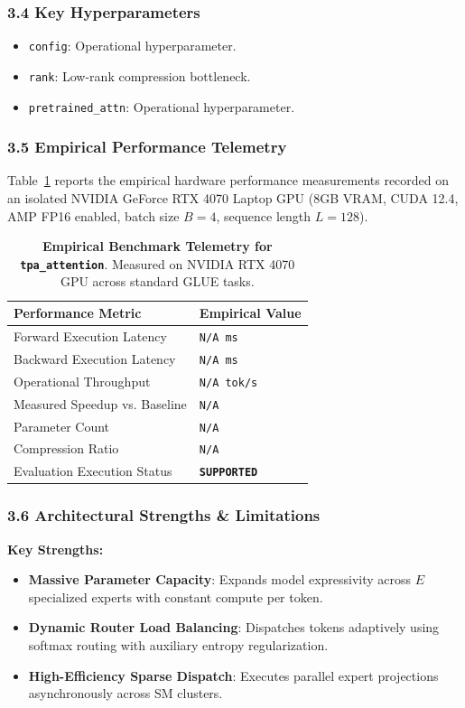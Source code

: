 \subsubsection*{3.4 Key Hyperparameters}
\begin{itemize}
    \item \texttt{config}: Operational hyperparameter.
    \item \texttt{rank}: Low-rank compression bottleneck.
    \item \texttt{pretrained\_attn}: Operational hyperparameter.
\end{itemize}

\subsubsection*{3.5 Empirical Performance Telemetry}
Table~\ref{tab:telemetry_tpa_attention} reports the empirical hardware performance measurements recorded on an isolated NVIDIA GeForce RTX 4070 Laptop GPU (8GB VRAM, CUDA 12.4, AMP FP16 enabled, batch size $B=4$, sequence length $L=128$).

\begin{table}[h]
\centering
\small
\caption{\textbf{Empirical Benchmark Telemetry for \texttt{tpa\_attention}}. Measured on NVIDIA RTX 4070 GPU across standard GLUE tasks.}
\label{tab:telemetry_tpa_attention}
\begin{tabularx}{\columnwidth}{lX}
\toprule
\textbf{Performance Metric} & \textbf{Empirical Value} \\
\midrule
Forward Execution Latency & \texttt{N/A ms} \\
Backward Execution Latency & \texttt{N/A ms} \\
Operational Throughput & \texttt{N/A tok/s} \\
Measured Speedup vs. Baseline & \texttt{N/A} \\
Parameter Count & \texttt{N/A} \\
Compression Ratio & \texttt{N/A} \\
Evaluation Execution Status & \textbf{\texttt{SUPPORTED}} \\
\bottomrule
\end{tabularx}
\end{table}

\subsubsection*{3.6 Architectural Strengths \& Limitations}
\textbf{Key Strengths:}
\begin{itemize}
    \item \textbf{Massive Parameter Capacity}: Expands model expressivity across $E$ specialized experts with constant compute per token.
    \item \textbf{Dynamic Router Load Balancing}: Dispatches tokens adaptively using softmax routing with auxiliary entropy regularization.
    \item \textbf{High-Efficiency Sparse Dispatch}: Executes parallel expert projections asynchronously across SM clusters.
\end{itemize}

